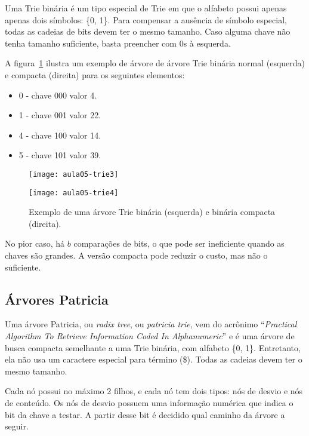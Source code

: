 Uma Trie binária é um tipo especial de Trie em que o alfabeto possui apenas 
apenas dois símbolos: \{0, 1\}.
Para compensar a ausência de símbolo especial, todas as cadeias de bits devem
ter o mesmo tamanho.
Caso alguma chave não tenha tamanho suficiente, basta preencher com 0s à
esquerda.

A figura~\ref{aula05:fig:trie3} ilustra um exemplo de árvore de árvore Trie binária
normal (esquerda) e compacta (direita) para os seguintes elementos:
\begin{itemize}
\item 0 - chave 000 valor 4.
\item 1 - chave 001 valor 22.
\item 4 - chave 100 valor 14.
\item 5 - chave 101 valor 39.
\end{itemize}
%
\begin{figure}[!htb]
\centering
  \begin{minipage}{0.4\textwidth}
	\centering
	\texttt{[image: aula05-trie3]}
  \end{minipage}
  \vline
  \begin{minipage}{0.4\textwidth}
	\centering
	\texttt{[image: aula05-trie4]}
  \end{minipage}
\caption{Exemplo de uma árvore Trie binária (esquerda) e binária compacta (direita).}
\label{aula05:fig:trie3}
\end{figure}

No pior caso, há $b$ comparações de bits, o que pode ser ineficiente quando as
chaves são grandes.  A versão compacta pode reduzir o custo, mas não o
suficiente.

\subsection{Árvores Patricia}

Uma árvore Patricia, ou \emph{radix tree}, ou \emph{patricia trie}, vem do
acrônimo ``\emph{Practical Algorithm To Retrieve Information Coded In
Alphanumeric}'' e é uma árvore de busca compacta semelhante a uma Trie binária,
com alfabeto \{0, 1\}.
Entretanto, ela não usa um caractere especial para término (\$).
Todas as cadeias devem ter o mesmo tamanho.

Cada nó possui no máximo 2 filhos, e cada nó tem dois tipos: nós de desvio e nós de conteúdo.
Os nós de desvio possuem uma informação numérica que indica o bit da chave a testar.
A partir desse bit é decidido qual caminho da árvore a seguir.


